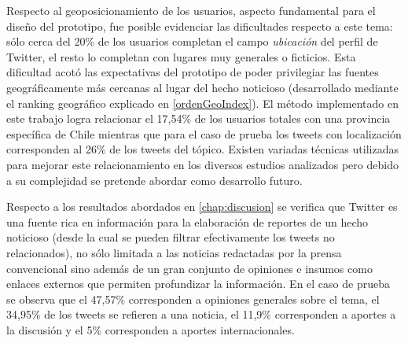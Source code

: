 Respecto al geoposicionamiento de los usuarios, aspecto fundamental para el diseño del prototipo, fue posible evidenciar las dificultades respecto a este tema: sólo cerca del 20\% de los usuarios completan el campo \emph{ubicación} del perfil de Twitter, el resto lo completan con lugares muy generales o ficticios. Esta dificultad acotó las expectativas del prototipo de poder privilegiar las fuentes geográficamente más cercanas al lugar del hecho noticioso (desarrollado mediante el ranking geográfico explicado en \ref{ordenGeoIndex}). El método implementado en este trabajo logra relacionar el 17,54\% de los usuarios totales con una provincia específica de Chile mientras que para el caso de prueba los tweets con localización corresponden al 26\% de los tweets del tópico. Existen variadas técnicas utilizadas para mejorar este relacionamiento en los diversos estudios analizados  \cite{Cheng:2010:YYT:1871437.1871535} \cite{McGee:2011:GST:2063576.2063959} pero debido a su complejidad se pretende abordar como desarrollo futuro. 






Respecto a los resultados abordados en \ref{chap:discusion} se verifica que Twitter es una fuente rica en información para la elaboración de reportes de un hecho noticioso (desde la cual se pueden filtrar efectivamente los tweets no relacionados), no sólo limitada a las noticias redactadas por la prensa convencional sino además de un gran conjunto de opiniones e insumos como enlaces externos que permiten profundizar la información. En el caso de prueba se observa que el 47,57\% corresponden a opiniones generales sobre el tema, el 34,95\% de los tweets se refieren a una noticia, el 11,9\% corresponden a aportes a la discusión y el 5\% corresponden a aportes internacionales.


